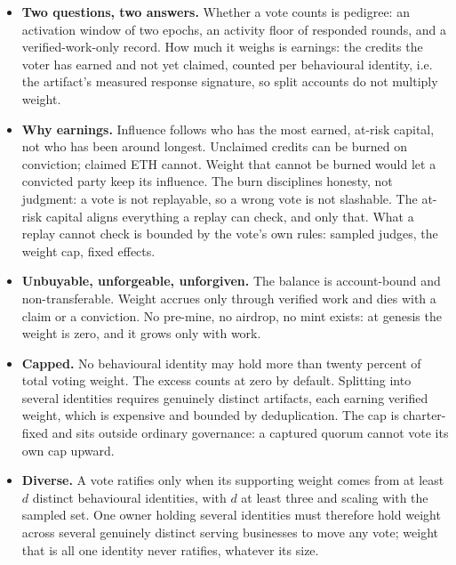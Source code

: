 \documentclass[11pt]{article}
\begin{document}
\begin{itemize}
    \item \textbf{Two questions, two answers.} Whether a vote counts
          is pedigree: an activation window of two epochs, an activity
          floor of responded rounds, and a verified-work-only record. How
          much it weighs is earnings: the credits the voter has earned and
          not yet claimed, counted per behavioural identity,
          i.e. the artifact's measured response signature, so split accounts
          do not multiply weight.
    \item \textbf{Why earnings.} Influence follows who has the most
          earned, at-risk capital, not who has been around longest.
          Unclaimed credits can be burned on conviction; claimed ETH
          cannot. Weight that cannot be burned would let a convicted party
          keep its influence. The burn disciplines honesty, not judgment:
          a vote is not replayable, so a wrong vote is not slashable. The
          at-risk capital aligns everything a replay can check, and only
          that. What a replay cannot check is bounded by the vote's own
          rules: sampled judges, the weight cap, fixed effects.
    \item \textbf{Unbuyable, unforgeable, unforgiven.} The balance
          is account-bound and non-transferable. Weight accrues only
          through verified work and dies with a claim or a conviction. No
          pre-mine, no airdrop, no mint exists: at genesis the weight is
          zero, and it grows only with work.
    \item \textbf{Capped.} No behavioural identity may hold more
          than twenty percent of total voting weight. The excess counts at
          zero by default. Splitting into several identities requires
          genuinely distinct artifacts, each earning verified weight, which
          is expensive and bounded by deduplication. The cap is
          charter-fixed and sits outside ordinary governance: a captured
          quorum cannot vote its own cap upward.
    \item \textbf{Diverse.} A vote ratifies only when its supporting
          weight comes from at least $d$ distinct behavioural identities,
          with $d$ at least three and scaling with the sampled set. One
          owner holding several identities must therefore hold weight
          across several genuinely distinct serving businesses to move any
          vote; weight that is all one identity never ratifies, whatever
          its size.

\end{itemize}
\end{document}
